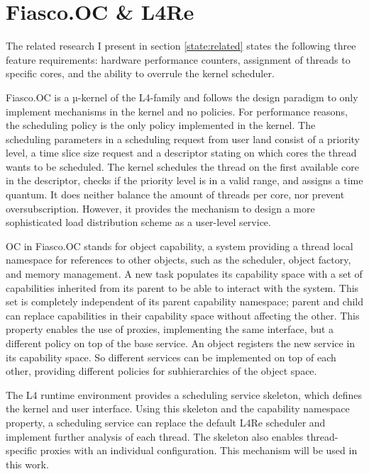 \section{Fiasco.OC \& L4Re}
\label{state:env}
The related research I present in section \ref{state:related} states the
following three feature requirements:
hardware performance counters, assignment of threads to specific
cores, and the ability to overrule the kernel scheduler.

Fiasco.OC is a µ-kernel of the L4-family and follows the design paradigm to
only implement mechanisms in the kernel and no policies.
For performance reasons, the scheduling policy is the only policy implemented in
the kernel.
The scheduling parameters in a scheduling request from user land consist of
a priority level, a time slice size request and a descriptor stating on which
cores the thread wants to be scheduled.
The kernel schedules the thread on the first available core in the descriptor,
checks if the priority level is in a valid range, and assigns a time
quantum.
It does neither balance the amount of threads per core, nor prevent
oversubscription.
However, it provides the mechanism to design a more sophisticated load
distribution scheme as a user-level service.

OC in Fiasco.OC stands for object capability, a system providing a thread local
namespace for references to other objects, such as the scheduler, object
factory, and memory management.
A new task populates its capability space with a set of capabilities inherited
from its parent to be able to interact with the system.
This set is completely independent of its parent capability namespace; parent
and child can replace capabilities in their capability space without affecting
the other.
This property enables the use of proxies, implementing the same interface, but
a different policy on top of the base service.
An object registers the new service in its capability space.
So different services can be implemented on top of each other, providing
different policies for subhierarchies of the object space.


The L4 runtime environment provides a scheduling service skeleton, which
defines the kernel and user interface.
Using this skeleton and the capability namespace property, a scheduling service
can replace the default L4Re scheduler and implement further analysis of each
thread.
The skeleton also enables thread-specific proxies with an individual
configuration.
This mechanism will be used in this work.


